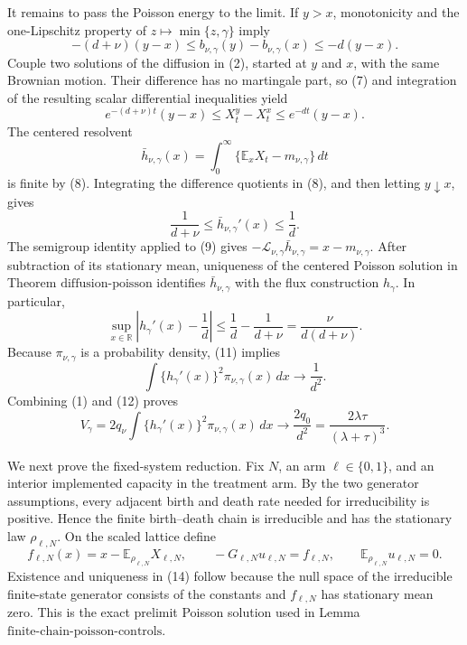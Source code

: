 It remains to pass the Poisson energy to the limit.  If \(y>x\), monotonicity and the one-Lipschitz property of \(z\mapsto\min\{z,\gamma\}\) imply
\[
 -(d+\nu)(y-x)
 \leq b_{\nu,\gamma}(y)-b_{\nu,\gamma}(x)
 \leq-d(y-x).
 \tag{7}
\]
Couple two solutions of the diffusion in (2), started at \(y\) and \(x\), with the same Brownian motion.  Their difference has no martingale part, so (7) and integration of the resulting scalar differential inequalities yield
\[
 e^{-(d+\nu)t}(y-x)
 \leq X_t^y-X_t^x
 \leq e^{-dt}(y-x).
 \tag{8}
\]
The centered resolvent
\[
 \bar h_{\nu,\gamma}(x)
 =\int_0^\infty
 \{\mathbb E_xX_t-m_{\nu,\gamma}\}\,dt
 \tag{9}
\]
is finite by (8).  Integrating the difference quotients in (8), and then letting \(y\downarrow x\), gives
\[
 \frac1{d+\nu}\leq \bar h_{\nu,\gamma}'(x)\leq\frac1d.
 \tag{10}
\]
The semigroup identity applied to (9) gives
\(-\mathcal L_{\nu,\gamma}\bar h_{\nu,\gamma}=x-m_{\nu,\gamma}\).  After subtraction of its stationary mean, uniqueness of the centered Poisson solution in Theorem \(\mathrm{diffusion\mbox{-}poisson}\) identifies \(\bar h_{\nu,\gamma}\) with the flux construction \(h_\gamma\).  In particular,
\[
 \sup_{x\in\mathbb R}\left|h_\gamma'(x)-\frac1d\right|
 \leq \frac1d-\frac1{d+\nu}
 =\frac{\nu}{d(d+\nu)}.
 \tag{11}
\]
Because \(\pi_{\nu,\gamma}\) is a probability density, (11) implies
\[
 \int\{h_\gamma'(x)\}^2\pi_{\nu,\gamma}(x)\,dx
 \longrightarrow\frac1{d^2}.
 \tag{12}
\]
Combining (1) and (12) proves
\[
 V_\gamma
 =2q_\nu\int\{h_\gamma'(x)\}^2\pi_{\nu,\gamma}(x)\,dx
 \longrightarrow \frac{2q_0}{d^2}
 =\frac{2\lambda\tau}{(\lambda+\tau)^3}.
 \tag{13}
\]

We next prove the fixed-system reduction.  Fix \(N\), an arm \(\ell\in\{0,1\}\), and an interior implemented capacity in the treatment arm.  By the two generator assumptions, every adjacent birth and death rate needed for irreducibility is positive.  Hence the finite birth--death chain is irreducible and has the stationary law \(\rho_{\ell,N}\).  On the scaled lattice define
\[
 f_{\ell,N}(x)=x-\mathbb E_{\rho_{\ell,N}}X_{\ell,N},
 \qquad
 -G_{\ell,N}u_{\ell,N}=f_{\ell,N},
 \qquad
 \mathbb E_{\rho_{\ell,N}}u_{\ell,N}=0.
 \tag{14}
\]
Existence and uniqueness in (14) follow because the null space of the irreducible finite-state generator consists of the constants and \(f_{\ell,N}\) has stationary mean zero.  This is the exact prelimit Poisson solution used in Lemma \(\mathrm{finite\mbox{-}chain\mbox{-}poisson\mbox{-}controls}\).

